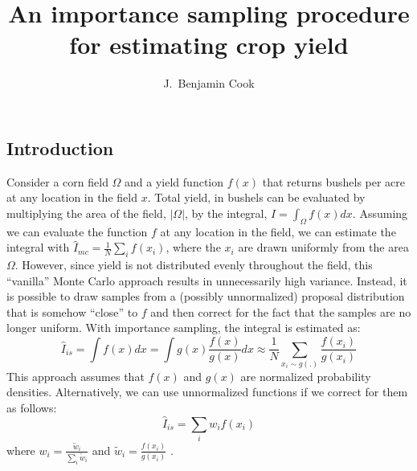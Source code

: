 \documentclass[thesis]{hmcposter}
\author{J.~Benjamin Cook}
\title{An importance sampling procedure\\ for estimating crop yield}
\begin{document}
\begin{poster}

\section{Introduction}

Consider a corn field $\Omega$ and a yield function $f(x)$ that returns bushels per acre at any location in the field $x$. Total yield, in bushels can be evaluated by multiplying the area of the field, $|\Omega|$, by the integral, $I = \int_{\Omega} f(x) dx$. Assuming we can evaluate the function $f$ at any location in the field, we can estimate the integral with $\hat{I}_{mc} = \frac{1}{N} \sum_i f(x_i)$, where the $x_i$ are drawn uniformly from the area $\Omega$. However, since yield is not distributed evenly throughout the field, this ``vanilla'' Monte Carlo approach results in unnecessarily high variance. Instead, it is possible to draw samples from a (possibly unnormalized) proposal distribution that is somehow ``close'' to $f$ and then correct for the fact that the samples are no longer uniform. With importance sampling, the integral is estimated as:
$$\hat{I}_{is} = \int f(x) dx = \int g(x) \frac{f(x)}{g(x)}dx \approx \frac{1}{N}\sum_{x_i \sim g(.)} \frac{f(x_i)}{g(x_i)}$$
This approach assumes that $f(x)$ and $g(x)$ are normalized probability densities. Alternatively, we can use unnormalized functions if we correct for them as follows:
$$\hat{I}_{is} = \sum_i w_i f(x_i)$$
where $w_i = \frac{\widetilde{w}_i}{\sum_i \widetilde{w}_i}$ and $\widetilde{w}_i = \frac{f(x_i)}{g(x_i)}$ \cite{murphy}.




\end{poster}
\end{document}
